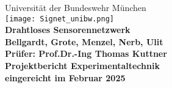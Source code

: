 
\begin{titlepage}
    \centering
    \vspace*{1cm}

    {\LARGE Universität der Bundeswehr München}\\[1.5cm]


    \texttt{[image: Signet\_unibw.png]}\\[1.5cm]

    {\Huge \textbf{Drahtloses Sensorennetzwerk}}\\[1.0cm]


    



    {\Large \textbf{Bellgardt, Grote, Menzel, Nerb, Ulit}}\\[1cm]

    {\Large \textbf{Prüfer: Prof.Dr.-Ing Thomas Kuttner}}\\[2cm]


    {\Large \textbf{Projektbericht Experimentaltechnik}}\\[2cm]

    {\Large \textbf{eingereicht im Februar 2025}}\\[2cm]

\end{titlepage}

